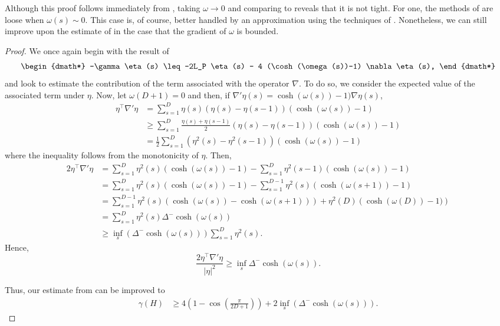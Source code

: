 Although this proof follows immediately from , taking $\omega \rightarrow 0$ and comparing to  reveals that it is not tight. For one, the methods of  are loose when $\omega(s)\sim 0$. This case is, of course, better handled by an approximation using the techniques of . Nonetheless, we can still improve upon the estimate of  in the case that the gradient of $\omega$ is bounded. 
\LCHarder*
\begin{proof}
	We once again begin with the result of 
	\begin{dgroup*}
	 	\begin{dmath*}
	 	-\gamma \eta(s) \leq -2L_P \eta(s) - 4 (\cosh(\omega(s))-1) \nabla \eta(s),
	 	\end{dmath*}
	 \end{dgroup*}
	 and look to estimate the contribution of the term associated with the operator $\nabla$. To do so, we consider the expected value of the associated term under $\eta$. Now, let $\omega(D+1)=0$ and then, if $\nabla'\eta(s)=\cosh(\omega(s))-1)\nabla\eta(s)$,
	 \begin{align*}
	 	\eta^{\top} \nabla' \eta &= \sum_{s=1}^{D} \eta(s)\left(\eta(s)-\eta(s-1)\right)(\cosh(\omega(s))-1) \\
	 	&\geq \sum_{s=1}^{D} \frac{\eta(s)+\eta(s-1)}{2}\left(\eta(s)-\eta(s-1)\right)(\cosh(\omega(s))-1) \\
	 	&=\frac{1}{2}\sum_{s=1}^{D}\left(\eta^2(s)-\eta^2(s-1)\right)(\cosh(\omega(s))-1)
	\end{align*}
	where the inequality follows from the monotonicity of $\eta$. Then,
	\begin{align*}	 	
	 	2 \eta^{\top} \nabla' \eta &=\sum_{s=1}^{D}\eta^2(s)(\cosh(\omega(s))-1) - \sum_{s=1}^{D}\eta^2(s-1)(\cosh(\omega(s))-1) \\
	 	&= \sum_{s=1}^{D}\eta^2(s)(\cosh(\omega(s))-1) - \sum_{s=1}^{D-1}\eta^2(s)(\cosh(\omega(s+1))-1) \\
	 	&= \sum_{s=1}^{D-1}\eta^2(s)(\cosh(\omega(s))-\cosh(\omega(s+1))) + \eta^2(D)\left(\cosh(\omega(D))-1)\right) \\
	 	&= \sum_{s=1}^{D}\eta^2(s)\Delta^- \cosh(\omega(s)) \\
	 	&\geq \inf_s\left(\Delta^- \cosh(\omega(s))\right)\sum_{s=1}^{D}\eta^2(s).
	 \end{align*}
	  Hence,
	\begin{equation*}
		\frac{2 \eta^{\top} \nabla' \eta}{\lvert \eta \rvert^2} \geq \inf_s \Delta^- \cosh \left( \omega(s)\right).
	\end{equation*}	 
	 
	 Thus, our estimate from  can be improved to
		\begin{align*}
			\gamma(H) &\geq 4\left(1-\cos\left(\frac{\pi}{2 D + 1}\right)\right) + 2\inf_s\left(\Delta^- \cosh(\omega(s))\right).
		\end{align*}
\end{proof}	

